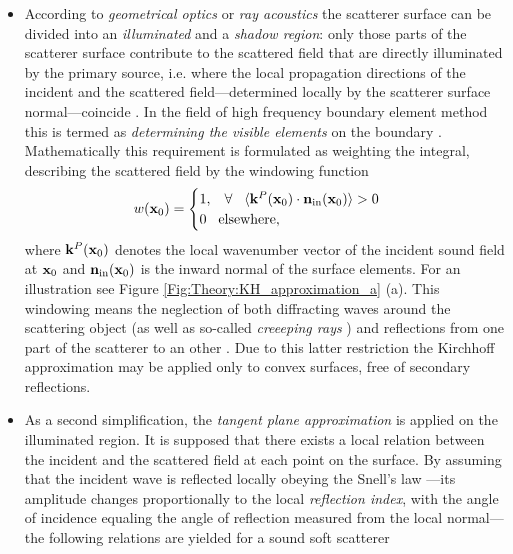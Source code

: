 \begin{itemize}
%
\item According to \emph{geometrical optics} or \emph{ray acoustics} the scatterer surface can be divided into an \emph{illuminated} and a \emph{shadow region}: only those parts of the scatterer surface contribute to the scattered field that are directly illuminated by the primary source, i.e. where the local propagation directions of the incident and the scattered field---determined locally by the scatterer surface normal---coincide \cite{doi:10.1121/1.1916538}.
In the field of high frequency boundary element method this is termed as \emph{determining the visible elements} on the boundary \cite{Herrin2003}.
Mathematically this requirement is formulated as weighting the integral, describing the scattered field by the windowing function
\begin{equation}
w(\mathbf{x}_0) = \begin{cases}
                        1, \hspace{3mm} \forall \hspace{3mm} \langle \mathbf{k}^P(\mathbf{x}_0) \cdot \mathbf{n}_{\mathrm{in}}(\mathbf{x}_0) \rangle > 0 \\
                        0  \hspace{3mm} \text{elsewhere},
                    \end{cases}
\label{eq:theory:windowing_function}
\end{equation}
where $\mathbf{k}^P(\mathbf{x}_0)$ denotes the local wavenumber vector of the incident sound field at $\mathbf{x}_0$ and $ \mathbf{n}_{\mathrm{in}}(\mathbf{x}_0)$ is the inward normal of the surface elements. For an illustration see Figure \ref{Fig:Theory:KH_approximation_a} (a).
%
This windowing means the neglection of both diffracting waves around the scattering object (as well as so-called \emph{creeeping rays} \cite{Bleistein1984}) and reflections from one part of the scatterer to an other \cite{Pignier2015}. 
Due to this latter restriction the Kirchhoff approximation may be applied only to convex surfaces, free of secondary reflections.
%
\item As a second simplification, the \emph{tangent plane approximation} is applied on the illuminated region.
It is supposed that there exists a local relation between the incident and the scattered field at each point on the surface.
By assuming that the incident wave is reflected locally obeying the Snell's law  \cite{Voronich2007}---its amplitude changes proportionally to the local \emph{reflection index}, with the angle of incidence equaling the angle of reflection measured from the local normal---the following relations are yielded for a sound soft scatterer \cite{Bleistein1984, Bleistein2000, Pike2002}

\end{itemize}
